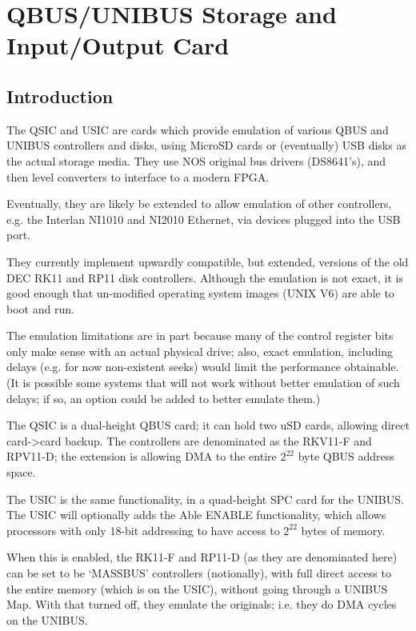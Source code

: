 %

\chapter{QBUS/UNIBUS Storage and Input/Output Card}
\section{Introduction}

The QSIC and USIC are cards which provide emulation of various QBUS and
UNIBUS controllers and disks, using MicroSD cards or (eventually) USB disks
as the actual storage media. They use NOS original bus drivers (DS8641's),
and then level converters to interface to a modern FPGA.

Eventually, they are likely be extended to allow emulation of other
controllers, e.g. the Interlan NI1010 and NI2010 Ethernet, via devices
plugged into the USB port.

They currently implement upwardly compatible, but extended, versions of the
old DEC RK11 and RP11 disk controllers. Although the emulation is not exact,
it is good enough that un-modified operating system images (UNIX V6) are able
to boot and run.

The emulation limitations are in part because many of the control register
bits only make sense with an actual physical drive; also, exact emulation,
including delays (e.g. for now non-existent seeks) would limit the
performance obtainable. (It is possible some systems that will not work
without better emulation of such delays; if so, an option could be added to
better emulate them.)

The QSIC is a dual-height QBUS card; it can hold two uSD cards, allowing
direct card->card backup. The controllers are denominated as the RKV11-F and
RPV11-D; the extension is allowing DMA to the entire $2^{22}$ byte QBUS
address space.

The USIC is the same functionality, in a quad-height SPC card for the UNIBUS.
The USIC will optionally adds the Able ENABLE functionality, which allows
processors with only 18-bit addressing to have access to $2^{22}$ bytes of
memory.

When this is enabled, the RK11-F and RP11-D (as they are denominated here)
can be set to be `MASSBUS' controllers (notionally), with full direct access
to the entire memory (which is on the USIC), without going through a UNIBUS
Map. With that turned off, they emulate the originals; i.e. they do DMA
cycles on the UNIBUS.

